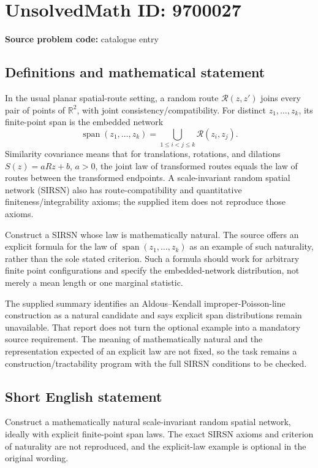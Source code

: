 \documentclass[11pt]{article}
\begin{document}
\section*{UnsolvedMath ID: 9700027}
\textbf{Source problem code:} catalogue entry
\subsection{Definitions and mathematical statement}
In the usual planar spatial-route setting, a random route $\mathcal R(z,z')$ joins every pair of points of $\mathbb R^2$, with joint consistency/compatibility. For distinct $z_1,\ldots,z_k$, its finite-point span is the embedded network
\[
\operatorname{span}(z_1,\ldots,z_k)=\bigcup_{1\leq i<j\leq k}\mathcal R(z_i,z_j).
\]
Similarity covariance means that for translations, rotations, and dilations $S(z)=aRz+b$, $a>0$, the joint law of transformed routes equals the law of routes between the transformed endpoints. A scale-invariant random spatial network (SIRSN) also has route-compatibility and quantitative finiteness/integrability axioms; the supplied item does not reproduce those axioms.

Construct a SIRSN whose law is mathematically natural. The source offers an explicit formula for the law of $\operatorname{span}(z_1,\ldots,z_k)$ as an example of such naturality, rather than the sole stated criterion. Such a formula should work for arbitrary finite point configurations and specify the embedded-network distribution, not merely a mean length or one marginal statistic.

The supplied summary identifies an Aldous--Kendall improper-Poisson-line construction as a natural candidate and says explicit span distributions remain unavailable. That report does not turn the optional example into a mandatory source requirement. The meaning of mathematically natural and the representation expected of an explicit law are not fixed, so the task remains a construction/tractability program with the full SIRSN conditions to be checked.
\subsection{Short English statement}
Construct a mathematically natural scale-invariant random spatial network, ideally with explicit finite-point span laws. The exact SIRSN axioms and criterion of naturality are not reproduced, and the explicit-law example is optional in the original wording.
\end{document}
